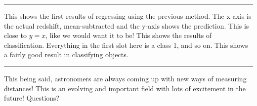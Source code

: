 \documentclass[11pt]{article}
\begin{document}
\noindent\rule[0.5ex]{\linewidth}{0.5pt}

\noindent This shows the first results of regressing using the previous method. The x-axis is the actual redshift, mean-subtracted and the y-axis shows the prediction. This is close to $y=x$, like we would want it to be! This shows the results of classification. Everything in the first slot here is a class 1, and so on. This shows a fairly good result in classifying objects.

\noindent\rule[0.5ex]{\linewidth}{1pt}

\noindent This being said, astronomers are always coming up with new ways of measuring distances! This is an evolving and important field with lots of excitement in the future! Questions?
\end{document}
